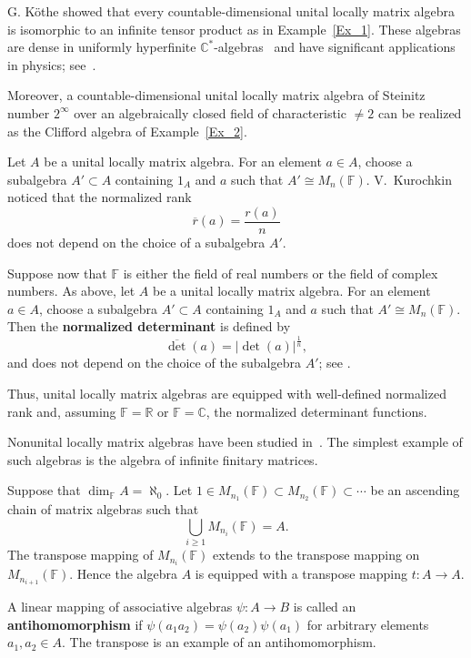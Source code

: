 \documentclass[12pt]{amsart}
\begin{document}
{ G. K\"{o}the \cite{Koethe}  showed that every countable-dimensional unital locally matrix algebra is isomorphic to an infinite tensor product as in Example~\ref{Ex_1}. These algebras are dense in uniformly hyperfinite $ \mathbb{C}^{*}$-algebras~\cite{Glimm} and have significant applications in physics; see~\cite{Bratteli-Robinson}.

Moreover, a countable-dimensional unital locally matrix algebra of Steinitz number $2^{\infty}$ over an algebraically closed field of characteristic $\neq 2$ can be realized as the Clifford algebra of Example~\ref{Ex_2}.


			
			Let $A$ be a unital locally matrix algebra.  
			For an element $a \in A$, choose a subalgebra $A' \subset A$ containing  $1_A$ and $ a$ such that  $A' \cong M_n(\mathbb{F})$.	V.~Kurochkin \cite{Kurochkin} noticed that the normalized rank
			\[
			\overline{r}(a) = \frac{r(a)}{n}
			\]
			does not depend on the choice of a subalgebra $A'$. 
			
	Suppose now that $\mathbb{F}$ is  either the field of real numbers or the field of complex numbers. As above, let $A$ be a unital locally matrix algebra.  	For an element $a \in A$, choose a subalgebra $A' \subset A$ containing  $1_A$ and $ a$ such that  $A' \cong M_n(\mathbb{F})$.
Then the \textbf{normalized determinant} is defined by
\[
\overline{\det}(a) = |\det(a)|^{\frac{1}{n}},
\]
and does not depend on the choice of the subalgebra $A'$; see \cite{Bezushchak}.


Thus, unital locally matrix algebras are equipped with well-defined normalized rank
and, assuming $\mathbb{F}=\mathbb{R}$ or $\mathbb{F}=\mathbb{C}$, the normalized determinant functions.

Nonunital locally matrix algebras have been studied in~\cite{Baranov2,Spectra_Bezushchak,Diskme}.
The simplest example of such algebras is the algebra of infinite finitary matrices.

			
			Suppose that $\dim_{\mathbb{F}} A = \aleph_0$.  
			Let $1 \in M_{n_1}(\mathbb{F}) \subset M_{n_2}(\mathbb{F}) \subset \cdots$  
			be an ascending chain of matrix algebras such that
			\[
			\bigcup_{i \ge 1} M_{n_i}(\mathbb{F}) = A.
			\]
			The transpose mapping of $M_{n_i}(\mathbb{F})$ extends to the transpose mapping on $M_{n_{i+1}}(\mathbb{F})$.  
			Hence the algebra $A$ is equipped with a transpose mapping	$t : A \to A.$
			
		
			
			A linear mapping of associative algebras $\psi : A \to B$ is called an \textbf{antihomomorphism} if
$	\psi(a_1 a_2) = \psi(a_2) \psi(a_1)$	for arbitrary elements $a_1, a_2 \in A$.  
			The transpose is an example of an antihomomorphism.
			
}
\end{document}

